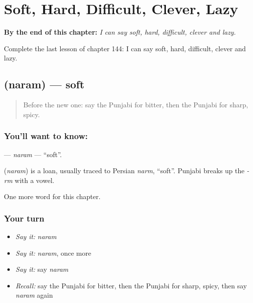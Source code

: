 
\chapter{Soft, Hard, Difficult, Clever, Lazy}
\label{ch:pa-soft-hard-difficult-clever-lazy}

\begin{chapteropening}
\textbf{By the end of this chapter:} \emph{I can say soft, hard, difficult, clever and lazy.}

Complete the last lesson of chapter 144: I can say soft, hard, difficult, clever and lazy.
\end{chapteropening}

\section[\texorpdfstring{\pa{ਨਰਮ} (naram)}{ਨਰਮ (naram)}]{ (naram) — soft}

\label{lesson:PA-C144-naram}



\begin{quote}
Before the new one: say the Punjabi for bitter, then the Punjabi for sharp, spicy.
\end{quote}

\subsection*{You'll want to know: }
\textbf{} — \emph{naram} — \textquotedblleft{}soft\textquotedblright{}.

\begin{cousinweb}
\textbf{} (\emph{naram}) is a loan, usually traced to Persian \emph{narm}, \textquotedblleft{}soft\textquotedblright{}. Punjabi breaks up the \emph{-rm} with a vowel.
\end{cousinweb}

\begin{grammarlens}[title={What you've built}]
One more word for this chapter.
\end{grammarlens}

\subsection*{Your turn}
\begin{itemize}
\raggedright
  \item \emph{Say it:} \emph{naram}
  \item \emph{Say it:} \emph{naram}, once more
  \item \emph{Say it:} say \emph{naram}
  \item \emph{Recall:} say the Punjabi for bitter, then the Punjabi for sharp, spicy, then say \emph{naram} again
\end{itemize}

